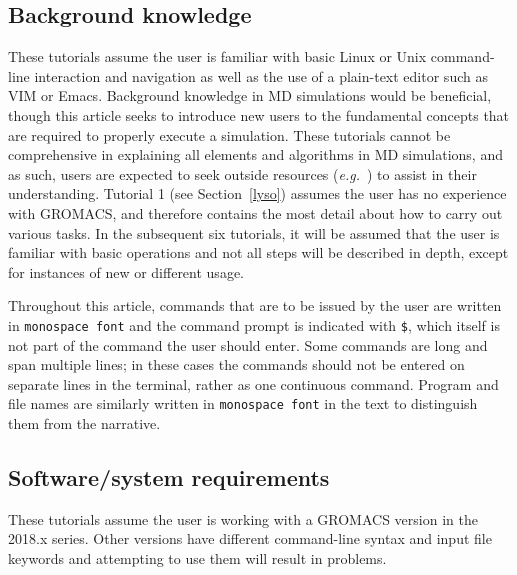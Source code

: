 \documentclass[9pt,tutorial,pubversion]{livecoms}
\begin{document}
\subsection{Background knowledge}
These tutorials assume the user is familiar with basic Linux or Unix command-line interaction and navigation as well as the use of a plain-text editor such as VIM or Emacs. Background knowledge in MD simulations would be beneficial, though this article seeks to introduce new users to the fundamental concepts that are required to properly execute a simulation. These tutorials cannot be comprehensive in explaining all elements and algorithms in MD simulations, and as such, users are expected to seek outside resources ({\em e.g.}~\cite{Frenkel2001,Leach2001,Kukol2008,Braun2018}) to assist in their understanding. Tutorial 1 (see Section~\ref{lyso}) assumes the user has no experience with GROMACS, and therefore contains the most detail about how to carry out various tasks. In the subsequent six tutorials, it will be assumed that the user is familiar with basic operations and not all steps will be described in depth, except for instances of new or different usage.

Throughout this article, commands that are to be issued by the user are written in \texttt{monospace font} and the command prompt is indicated with \texttt{\$}, which itself is not part of the command the user should enter. Some commands are long and span multiple lines; in these cases the commands should not be entered on separate lines in the terminal, rather as one continuous command. Program and file names are similarly written in \texttt{monospace font} in the text to distinguish them from the narrative.

\subsection{Software/system requirements}
These tutorials assume the user is working with a GROMACS version in the 2018.x series. Other versions have different command-line syntax and input file keywords and attempting to use them will result in problems.
\end{document}
